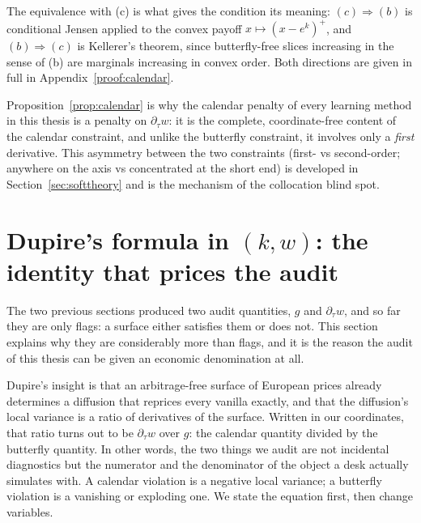 The equivalence with (c) is what gives the condition its meaning: $(c)\Rightarrow(b)$ is
conditional Jensen applied to the convex payoff $x\mapsto(x-e^k)^+$, and $(b)\Rightarrow(c)$ is
Kellerer's theorem, since butterfly-free slices increasing in the sense of (b) are marginals
increasing in convex order. Both directions are given in full in Appendix~\ref{proof:calendar}.

\begin{remark}\label{rem:calpenalty}
Proposition~\ref{prop:calendar} is why the calendar penalty of every learning method in this
thesis is a penalty on $\partial_\tau w$: it is the complete, coordinate-free content of the
calendar constraint, and unlike the butterfly constraint, it involves only a \emph{first}
derivative. This asymmetry between the two constraints (first- vs second-order; anywhere on
the axis vs concentrated at the short end) is developed in Section~\ref{sec:softtheory} and is
the mechanism of the collocation blind spot.
\end{remark}

\section{Dupire's formula in $(k,w)$: the identity that prices the audit}\label{sec:dupiresec}

The two previous sections produced two audit quantities, $g$ and $\partial_\tau w$, and so far
they are only flags: a surface either satisfies them or does not. This section explains why they
are considerably more than flags, and it is the reason the audit of this thesis can be given an
economic denomination at all.

Dupire's insight is that an arbitrage-free surface of European prices already determines a
diffusion that reprices every vanilla exactly, and that the diffusion's local variance is a
ratio of derivatives of the surface. Written in our coordinates, that ratio turns out to be
$\partial_\tau w$ over $g$: the calendar quantity divided by the butterfly quantity. In other
words, the two things we audit are not incidental diagnostics but the numerator and the
denominator of the object a desk actually simulates with. A calendar violation is a negative
local variance; a butterfly violation is a vanishing or exploding one. We state the equation
first, then change variables.

